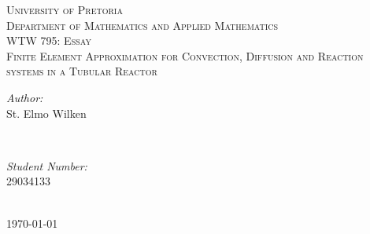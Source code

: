 \begin{titlepage}

\center %
 

\textsc{\LARGE University of Pretoria}\\[1.5cm] %
\textsc{\Large Department of Mathematics and Applied Mathematics}\\[0.5cm] %
\textsc{\large WTW 795: Essay}\\[3.5cm] %



\huge \textsc{Finite Element Approximation for Convection, Diffusion and Reaction systems in a Tubular Reactor} \\[3.5cm]
 

\begin{minipage}{0.4\textwidth}
\begin{flushleft} \large
\emph{Author:}\\
St. Elmo Wilken %
\end{flushleft}
\end{minipage}
~
\begin{minipage}{0.4\textwidth}
\begin{flushright} \large
\emph{Student Number:} \\
29034133 %
\end{flushright}
\end{minipage}\\[4cm]



{\large \today}\\[3cm] %

\vfill %

\end{titlepage}